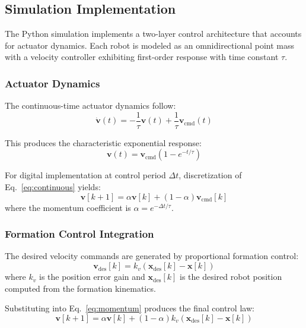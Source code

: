 \subsection{Simulation Implementation}
\label{sec:simulation}

The Python simulation implements a two-layer control architecture that accounts for actuator dynamics. Each robot is modeled as an omnidirectional point mass with a velocity controller exhibiting first-order response with time constant $\tau$.

\subsubsection{Actuator Dynamics}

The continuous-time actuator dynamics follow:
\begin{equation}
\dot{\mathbf{v}}(t) = -\frac{1}{\tau}\mathbf{v}(t) + \frac{1}{\tau}\mathbf{v}_{\text{cmd}}(t)
\label{eq:continuous}
\end{equation}

This produces the characteristic exponential response:
\begin{equation}
\mathbf{v}(t) = \mathbf{v}_{\text{cmd}}(1 - e^{-t/\tau})
\end{equation}

For digital implementation at control period $\Delta t$, discretization of Eq.~\eqref{eq:continuous} yields:
\begin{equation}
\mathbf{v}[k+1] = \alpha \mathbf{v}[k] + (1-\alpha)\mathbf{v}_{\text{cmd}}[k]
\label{eq:momentum}
\end{equation}
where the momentum coefficient is $\alpha = e^{-\Delta t/\tau}$.

\subsubsection{Formation Control Integration}

The desired velocity commands are generated by proportional formation control:
\begin{equation}
\mathbf{v}_{\text{des}}[k] = k_v(\mathbf{x}_{\text{des}}[k] - \mathbf{x}[k])
\end{equation}
where $k_v$ is the position error gain and $\mathbf{x}_{\text{des}}[k]$ is the desired robot position computed from the formation kinematics.

Substituting into Eq.~\eqref{eq:momentum} produces the final control law:
\begin{equation}
\mathbf{v}[k+1] = \alpha \mathbf{v}[k] + (1-\alpha)k_v(\mathbf{x}_{\text{des}}[k] - \mathbf{x}[k])
\label{eq:final_control}
\end{equation}

